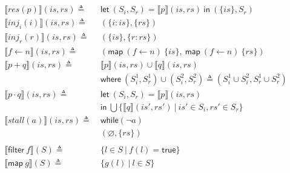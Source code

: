 \documentclass[12pt, letterpaper]{article}
\let\emptyset\varnothing
\newcommand\interp[1]{\llbracket #1 \rrbracket}
\begin{document}
\begin{align*}
            \\
        \interp { res(p) }(\mathit{is}, \mathit{rs})
            \triangleq\ &
            \mathsf{let}\ (S_i,S_r) = \interp {p}(\mathit{is}, \mathit{rs})\ 
            \mathsf{in}\ (\{\mathit{is}\}, S_r)
            \\
        \interp { inj_{i}(i) }(\mathit{is}, \mathit{rs})
            \triangleq\ &
            (\{\mathit{i : is}\}, \{\mathit{rs}\}) 
            \\
        \interp { inj_{r}(r) }(\mathit{is}, \mathit{rs})
            \triangleq\ &
            (\{\mathit{is}\},\{ \mathit{r : rs}\})
            \\
        \interp { f \leftarrow n }(is, rs)
            \triangleq\ &
            (\mathsf{map}\ (f\leftarrow n)\ \{is\},\
             \mathsf{map}\ (f\leftarrow n)\ \{rs\})
            \\ %
        \interp { p + q }(\mathit{is}, \mathit{rs})
            \triangleq\ &
            \interp { p }(\mathit{is}, \mathit{rs})\cup
            \interp { q }(\mathit{is}, \mathit{rs}) \\
            &\mathsf{where}\ (S_i^1, S_r^1)\cup (S_i^2, S_r^2)\triangleq
                (S_i^1\cup S_i^2, S_r^1\cup S_r^2)\\
        \interp { p \cdot q }(\mathit{is}, \mathit{rs})
            \triangleq\ &
            \mathsf{let}\ (S_i, S_r) = \interp{p}(is, rs)\\
            &\mathsf{in}\ \bigcup \{\interp{q}(\mathit{is}',\mathit{rs}')\ |\ \mathit{is}'\in S_i, \mathit{rs'}\in S_r\}\\
        \interp {stall(a)}(\mathit{is}, \mathit{rs})
            \triangleq\ &
            \mathsf{while} (\neg a)\\
            &(\emptyset,\{\mathit{rs}\})
            \\
            \\
        \interp{\mathsf{filter}\ f}(S)
            \triangleq\ & \{l \in S\ |\ f(l) = \mathsf{true}\}\\
        \interp{\mathsf{map}\ g}(S)
            \triangleq\ &
            \{ g(l)\ |\ l\in S \} 
    \end{align*}
\end{document}
